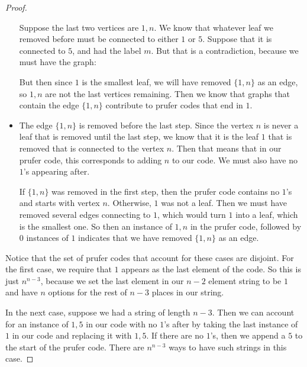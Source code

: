 \documentclass{article}
\begin{document}
\begin{proof}
\begin{itemize}
                Suppose the last two vertices are $1, n$. We know that whatever leaf we removed before must be connected to either $1$ or $5$. Suppose that it is connected to $5$, and had the label $m$. But that is a contradiction, because we must have the graph: 
                    \begin{center}
                    \end{center}
                But then since $1$ is the smallest leaf, we will have removed $\{1, n\}$ as an edge, so $1, n$ are not the last vertices remaining. Then we know that graphs that contain the edge $\{1, n\}$ contribute to prufer codes that end in $1$.

                \item The edge $\{1, n\}$ is removed before the last step. Since the vertex $n$ is never a leaf that is removed until the last step, we know that it is the leaf $1$ that is removed that is connected to the vertex $n$. Then that means that in our prufer code, this corresponds to adding $n$ to our code. We must also have no $1$'s appearing after.

                If $\{1, n\}$ was removed in the first step, then the prufer code contains no $1$'s and starts with vertex $n$. Otherwise, $1$ was not a leaf. Then we must have removed several edges connecting to $1$, which would turn $1$ into a leaf, which is the smallest one. So then an instance of $1, n$ in the prufer code, followed by $0$ instances of $1$ indicates that we have removed $\{1, n\}$ as an edge.
            \end{itemize}
        Notice that the set of prufer codes that account for these cases are disjoint. For the first case, we require that $1$ appears as the last element of the code. So this is just $n^{n - 3}$, because we set the last element in our $n - 2$ element string to be $1$ and have $n$ options for the rest of $n - 3$ places in our string. 

        In the next case, suppose we had a string of length $n - 3$. Then we can account for an instance of $1, 5$ in our code with no $1$'s after by taking the last instance of $1$ in our code and replacing it with $1, 5$. If there are no $1$'s, then we append a $5$ to the start of the prufer code. There are $n^{n - 3}$ ways to have such strings in this case.


\end{proof}
\end{document}
